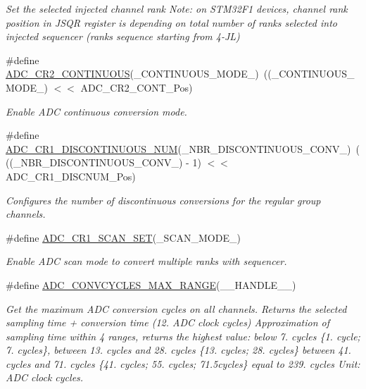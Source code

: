 \begin{DoxyCompactItemize}
\begin{DoxyCompactList}\small\item\em Set the selected injected channel rank Note\+: on S\+T\+M32\+F1 devices, channel rank position in J\+S\+QR register is depending on total number of ranks selected into injected sequencer (ranks sequence starting from 4-\/\+JL) \end{DoxyCompactList}\item 
\#define \hyperlink{group___a_d_c___private___macros_gae92924f248b2fd7693ce648275a8087c}{A\+D\+C\+\_\+\+C\+R2\+\_\+\+C\+O\+N\+T\+I\+N\+U\+O\+US}(\+\_\+\+C\+O\+N\+T\+I\+N\+U\+O\+U\+S\+\_\+\+M\+O\+D\+E\+\_\+)~((\+\_\+\+C\+O\+N\+T\+I\+N\+U\+O\+U\+S\+\_\+\+M\+O\+D\+E\+\_\+) $<$$<$ A\+D\+C\+\_\+\+C\+R2\+\_\+\+C\+O\+N\+T\+\_\+\+Pos)
\begin{DoxyCompactList}\small\item\em Enable A\+DC continuous conversion mode. \end{DoxyCompactList}\item 
\#define \hyperlink{group___a_d_c___private___macros_gaf52092c7978306ff922b2a6b42087472}{A\+D\+C\+\_\+\+C\+R1\+\_\+\+D\+I\+S\+C\+O\+N\+T\+I\+N\+U\+O\+U\+S\+\_\+\+N\+UM}(\+\_\+\+N\+B\+R\+\_\+\+D\+I\+S\+C\+O\+N\+T\+I\+N\+U\+O\+U\+S\+\_\+\+C\+O\+N\+V\+\_\+)~(((\+\_\+\+N\+B\+R\+\_\+\+D\+I\+S\+C\+O\+N\+T\+I\+N\+U\+O\+U\+S\+\_\+\+C\+O\+N\+V\+\_\+) -\/ 1) $<$$<$ A\+D\+C\+\_\+\+C\+R1\+\_\+\+D\+I\+S\+C\+N\+U\+M\+\_\+\+Pos)
\begin{DoxyCompactList}\small\item\em Configures the number of discontinuous conversions for the regular group channels. \end{DoxyCompactList}\item 
\#define \hyperlink{group___a_d_c___private___macros_ga8cd628bbd49f48a40b2de13077c7ba3d}{A\+D\+C\+\_\+\+C\+R1\+\_\+\+S\+C\+A\+N\+\_\+\+S\+ET}(\+\_\+\+S\+C\+A\+N\+\_\+\+M\+O\+D\+E\+\_\+)
\begin{DoxyCompactList}\small\item\em Enable A\+DC scan mode to convert multiple ranks with sequencer. \end{DoxyCompactList}\item 
\#define \hyperlink{group___a_d_c___private___macros_ga649e53d6a9a5716d9dce4d58904a3884}{A\+D\+C\+\_\+\+C\+O\+N\+V\+C\+Y\+C\+L\+E\+S\+\_\+\+M\+A\+X\+\_\+\+R\+A\+N\+GE}(\+\_\+\+\_\+\+H\+A\+N\+D\+L\+E\+\_\+\+\_\+)
\begin{DoxyCompactList}\small\item\em Get the maximum A\+DC conversion cycles on all channels. Returns the selected sampling time + conversion time (12. A\+DC clock cycles) Approximation of sampling time within 4 ranges, returns the highest value\+: below 7. cycles \{1. cycle; 7. cycles\}, between 13. cycles and 28. cycles \{13. cycles; 28. cycles\} between 41. cycles and 71. cycles \{41. cycles; 55. cycles; 71.\+5cycles\} equal to 239. cycles Unit\+: A\+DC clock cycles. \end{DoxyCompactList}\item 

\end{DoxyCompactItemize}
